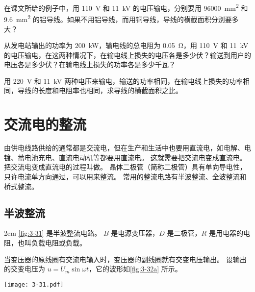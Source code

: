 \begin{Practice}
\begin{question}
\item 在课文所给的例子中，用 \qty{110}{V} 和 \qty{11}{kV} 的电压输电，分别要用 \qty{96000}{mm^2} 和 \qty{9.6}{mm^2} 的铝导线。如果不用铝导线，而用铜导线，导线的横截面积分别要多大？
\item 从发电站输出的功率为 \qty{200}{kW}，输电线的总电阻为 \qty{0.05}{\ohm}，用 \qty{110}{V} 和 \qty{11}{kV} 的电压输电，在这两种情况下，在输电线上损失的电压各是多少伏？输送到用户的电压各是多少伏？在输电线上损失的功率各是多少千瓦？
\item 用 \qty{220}{V} 和 \qty{11}{kV} 两种电压来输电，输送的功率相同，在输电线上损失的功率相同，导线的长度和电阻率也相同，求导线的横截面积之比。
\end{question}
\end{Practice}

\section{交流电的整流}
由供电线路供给的通常都是交流电，但在生产和生活中也要用直流电，如电解、电镀、蓄电池充电、直流电动机等都要用直流电。
这就需要把交流电变成直流电。
把交流电变成直流电的过程叫做。
晶体二极管（简称二极管）具有单向导电性，只许电流单方向通过，可以用来整流。
常用的整流电路有半波整流、全波整流和桥式整流。

\subsection{半波整流}

\medskip\noindent
\begin{minipage}{0.5\linewidth}\parindent2em
\cref{fig:3-31} 是半波整流电路。
$B$ 是电源变压器，$D$ 是二极管，$R$ 是用电器的电阻，也叫负载电阻或负载。

当变压器的原线圈有交流电输入时，变压器的副线圈就有交变电压输出。
设输出的交变电压为 $u=U_m\sin\omega t$，它的波形如\cref{fig:3-32a} 所示。
\end{minipage}\hfill
\begin{minipage}{0.45\linewidth}\centering
  \begin{figurehere}
    \texttt{[image: 3-31.pdf]}
    \caption{}\label{fig:3-31}
  \end{figurehere}
\end{minipage}\par\medskip

